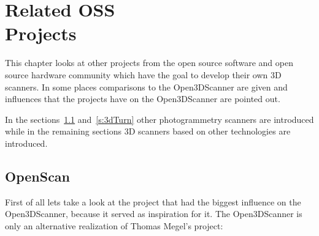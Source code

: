 \chapter[Related OSS Projects]{Related OSS\\Projects}%
\label{c:rel_projects}%
This chapter looks at other projects from the open source software and open source hardware community which have the goal to develop their own 3D scanners. In some places comparisons to the Open3DScanner are given and influences that the projects have on the Open3DScanner are pointed out.%

In the sections~\ref{s:open_scan} and~\ref{s:3dTurn} other photogrammetry scanners are introduced while in the remaining sections 3D scanners based on other technologies are introduced.%

\section{OpenScan}%
\label{s:open_scan}%
First of all lets take a look at the project that had the biggest influence on the Open3DScanner, because it served as inspiration for it. The Open3DScanner is only an alternative realization of Thomas Megel's project:%

%
%

